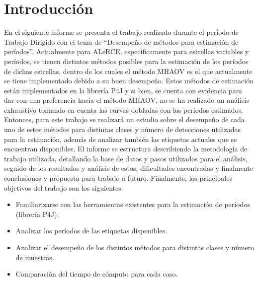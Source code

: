 \section{Introducción}
En el siguiente informe se presenta el trabajo realizado durante el período de Trabajo Dirigido con el tema de ``Desempeño de métodos para estimación de períodos''. Actualmente para ALeRCE, específicamente para estrellas variables y períodos, se tienen distintos métodos posibles para la estimación de los períodos de dichas estrellas, dentro de los cuales el método MHAOV es el que actualmente se tiene implementado debido a su buen desempeño. Estos métodos de estimación están implementados en la librería P4J y si bien, se cuenta con evidencia para dar con una preferencia hacia el método MHAOV, no se ha realizado un análisis exhaustivo tomando en cuenta las curvas dobladas con los períodos estimados. Entonces, para este trabajo se realizará un estudio sobre el desempeño de cada uno de estos métodos para distintas clases y número de detecciones utilizadas para la estimación, además de analizar también las etiquetas actuales que se encuentran disponibles. El informe se estructura describiendo la metodología de trabajo utilizada, detallando la base de datos y pasos utilizados para el análisis, seguido de los resultados y análisis de estos, dificultades encontradas y finalmente conclusiones y propuesta para trabajo a futuro. Finalmente, los principales objetivos del trabajo son los siguientes:

	\begin{itemize}
	    \item Familiarizarse con las herramientas existentes para la estimación de períodos (librería P4J). 
	    \item Analizar los períodos de las etiquetas disponibles.
		\item Analizar el desempeño de los distintos métodos para distintas clases y número de muestras.
		\item Comparación del tiempo de cómputo para cada caso.
	\end{itemize}
